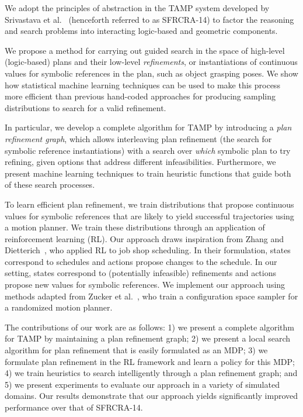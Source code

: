 We adopt the principles of abstraction in the TAMP system developed by
Srivastava et al.~\cite{srivastava2014combined} (henceforth referred
to as SFRCRA-14) to factor the reasoning and search problems into
interacting logic-based and geometric components.

We propose a method for carrying out guided search in the space of
high-level (logic-based) plans and their low-level
\emph{refinements}, or instantiations of continuous values for
symbolic references in the plan, such as object grasping poses.
We show how statistical machine learning techniques can be used
to make this process more efficient than previous hand-coded
approaches for producing sampling distributions to search for a valid refinement.

In particular, we develop a complete algorithm for TAMP by introducing
a \emph{plan refinement graph}, which allows interleaving plan
refinement (the search for symbolic reference instantiations) with a
search over \emph{which} symbolic plan to try refining, given options
that address different infeasibilities. Furthermore, we present
machine learning techniques to train heuristic functions that guide
both of these search processes.

To learn efficient plan refinement, we train distributions
that propose continuous values for symbolic references that are likely to yield
successful trajectories using a motion planner. We train these distributions through an
application of reinforcement learning (RL). Our approach draws inspiration
from Zhang and Dietterich~\cite{JobShopSched}, who applied RL to job
shop scheduling. In their formulation, states correspond to schedules
and actions propose changes to the schedule. In our setting, states
correspond to (potentially infeasible) refinements and actions propose
new values for symbolic references. We implement our approach using methods
adapted from Zucker et al.~\cite{workspacebias}, who train a
configuration space sampler for a randomized motion planner.

The contributions of our work are as follows: 1) we present a complete
algorithm for TAMP by maintaining a plan refinement graph; 2) we
present a local search algorithm for plan refinement that is easily
formulated as an MDP; 3) we formulate plan refinement in the RL
framework and learn a policy for this MDP; 4) we train heuristics to
search intelligently through a plan refinement graph; and 5) we
present experiments to evaluate our approach in a variety of simulated
domains. Our results demonstrate that our approach yields
significantly improved performance over that of SFRCRA-14.
